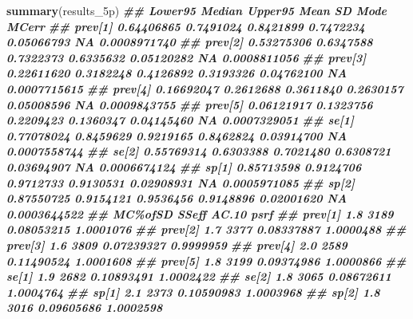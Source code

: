 \documentclass[
  ignorenonframetext,
]{beamer}
\newenvironment{Shaded}{\begin{snugshade}}{\end{snugshade}}
\newcommand{\DocumentationTok}[1]{\textcolor[rgb]{0.56,0.35,0.01}{\textbf{\textit{#1}}}}
\newcommand{\FunctionTok}[1]{\textcolor[rgb]{0.13,0.29,0.53}{\textbf{#1}}}
\newcommand{\NormalTok}[1]{#1}
\begin{document}
\begin{frame}[fragile]
\scriptsize

\begin{Shaded}
\begin{Highlighting}[]
\FunctionTok{summary}\NormalTok{(results\_5p)}
\DocumentationTok{\#\#            Lower95    Median   Upper95      Mean         SD Mode        MCerr}
\DocumentationTok{\#\# prev[1] 0.64406865 0.7491024 0.8421899 0.7472234 0.05066793   NA 0.0008971740}
\DocumentationTok{\#\# prev[2] 0.53275306 0.6347588 0.7322373 0.6335632 0.05120282   NA 0.0008811056}
\DocumentationTok{\#\# prev[3] 0.22611620 0.3182248 0.4126892 0.3193326 0.04762100   NA 0.0007715615}
\DocumentationTok{\#\# prev[4] 0.16692047 0.2612688 0.3611840 0.2630157 0.05008596   NA 0.0009843755}
\DocumentationTok{\#\# prev[5] 0.06121917 0.1323756 0.2209423 0.1360347 0.04145460   NA 0.0007329051}
\DocumentationTok{\#\# se[1]   0.77078024 0.8459629 0.9219165 0.8462824 0.03914700   NA 0.0007558744}
\DocumentationTok{\#\# se[2]   0.55769314 0.6303388 0.7021480 0.6308721 0.03694907   NA 0.0006674124}
\DocumentationTok{\#\# sp[1]   0.85713598 0.9124706 0.9712733 0.9130531 0.02908931   NA 0.0005971085}
\DocumentationTok{\#\# sp[2]   0.87550725 0.9154121 0.9536456 0.9148896 0.02001620   NA 0.0003644522}
\DocumentationTok{\#\#         MC\%ofSD SSeff      AC.10      psrf}
\DocumentationTok{\#\# prev[1]     1.8  3189 0.08053215 1.0001076}
\DocumentationTok{\#\# prev[2]     1.7  3377 0.08337887 1.0000488}
\DocumentationTok{\#\# prev[3]     1.6  3809 0.07239327 0.9999959}
\DocumentationTok{\#\# prev[4]     2.0  2589 0.11490524 1.0001608}
\DocumentationTok{\#\# prev[5]     1.8  3199 0.09374986 1.0000866}
\DocumentationTok{\#\# se[1]       1.9  2682 0.10893491 1.0002422}
\DocumentationTok{\#\# se[2]       1.8  3065 0.08672611 1.0004764}
\DocumentationTok{\#\# sp[1]       2.1  2373 0.10590983 1.0003968}
\DocumentationTok{\#\# sp[2]       1.8  3016 0.09605686 1.0002598}
\end{Highlighting}
\end{Shaded}

\normalsize
\end{frame}
\end{document}
